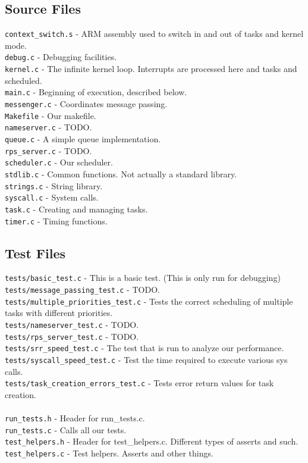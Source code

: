 \documentclass[letterpaper]{article}
\begin{document}
\subsection{Source Files}
\verb!context_switch.s! - ARM assembly used to switch in and out of tasks and kernel mode.\\
\verb!debug.c! - Debugging facilities.\\
\verb!kernel.c! - The infinite kernel loop. Interrupts are processed here and tasks and scheduled.\\
\verb!main.c! - Beginning of execution, described below.\\
\verb!messenger.c! - Coordinates message passing.\\
\verb!Makefile! - Our makefile.\\
\verb!nameserver.c! - TODO.\\
\verb!queue.c! - A simple queue implementation.\\
\verb!rps_server.c! - TODO.\\
\verb!scheduler.c! - Our scheduler.\\
\verb!stdlib.c! - Common functions. Not actually a standard library.\\
\verb!strings.c! - String library.\\
\verb!syscall.c! - System calls.\\
\verb!task.c! - Creating and managing tasks.\\
\verb!timer.c! - Timing functions.\\

\subsection{Test Files}
\verb!tests/basic_test.c! - This is a basic test. (This is only run for debugging)\\
\verb!tests/message_passing_test.c! - TODO.\\
\verb!tests/multiple_priorities_test.c! - Tests the correct scheduling of multiple tasks with different priorities.\\
\verb!tests/nameserver_test.c! - TODO.\\
\verb!tests/rps_server_test.c! - TODO.\\
\verb!tests/srr_speed_test.c! - The test that is run to analyze our performance.\\
\verb!tests/syscall_speed_test.c! - Test the time required to execute various sys calls.\\
\verb!tests/task_creation_errors_test.c! - Tests error return values for task creation.\\
\\
\verb!run_tests.h! - Header for run\_tests.c.\\
\verb!run_tests.c! - Calls all our tests.\\
\verb!test_helpers.h! - Header for test\_helpers.c. Different types of asserts and such.\\
\verb!test_helpers.c! - Test helpers. Asserts and other things.
\end{document}
